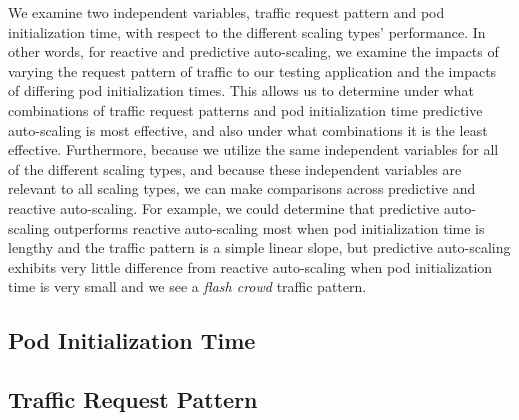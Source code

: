 We examine two independent variables, traffic request pattern and pod
initialization time, with respect to the different scaling types' performance.
In other words, for reactive and predictive
auto-scaling, we examine the impacts of varying the request pattern of traffic
to our testing application and the impacts of differing pod initialization
times. This allows us to determine under what combinations of traffic request
patterns and pod initialization time predictive auto-scaling is most effective,
and also under what combinations it is the least effective. Furthermore, because
we utilize the same independent variables for all of the different scaling
types, and because these independent variables are relevant to all scaling
types, we can make comparisons across predictive and reactive auto-scaling.
For example, we could determine that predictive
auto-scaling outperforms reactive auto-scaling most
when pod initialization time is lengthy and the traffic pattern is a simple
linear slope, but predictive auto-scaling exhibits very little difference from
reactive auto-scaling when pod initialization time is very small and we see a
\textit{flash crowd} traffic pattern.

\subsection{Pod Initialization Time}



\subsection{Traffic Request Pattern}


